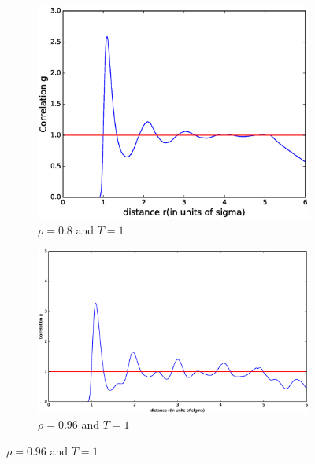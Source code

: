 \documentclass[twoside]{article}
\begin{document}
\begin{figure}[h]
	\begin{subfigure}[b]{0.48\textwidth}
	\centering
	\includegraphics[width=0.9\linewidth]{fig/figure_corr_gas.eps}
	\caption{$\rho = 0.8$ and $T = 1$}
	\label{fig:figure_corr_gas}
	\end{subfigure}
	\begin{subfigure}[b]{0.48\textwidth}
		\centering
		\includegraphics[width=0.9\linewidth]{fig/figure_corr_liquid.eps}
		\caption{$\rho = 0.96$ and $T = 1$}
		\label{fig:figure_corr_liquid}
	\end{subfigure}
	

\end{figure}
\end{document}
